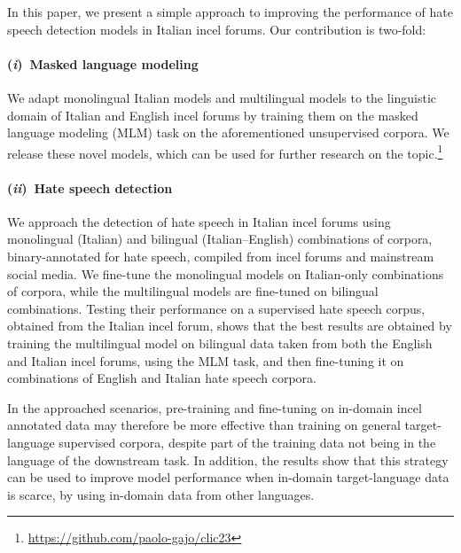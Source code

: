 \documentclass[11pt]{article}
\newcommand{\Ni}{({\em i})~}
\newcommand{\Nii}{({\em ii})~}
\newcommand{\todoA}[1]{\todo[color=blue!40]{A: #1}}
\begin{document}
In this paper, we present a simple approach to improving the performance of hate speech detection models in Italian incel forums. Our contribution is two-fold:


\paragraph{\Ni Masked language modeling} We adapt monolingual Italian models and multilingual models to the linguistic domain of Italian and English incel forums by training them on the masked language modeling (MLM) task on the aforementioned unsupervised corpora. We release these novel models, which can be used for further research on the topic.\footnote{\url{https://github.com/paolo-gajo/clic23}}

\paragraph{\Nii Hate speech detection}
We approach the detection of hate speech in Italian incel forums using monolingual (Italian) and bilingual (Italian--English) combinations of corpora, binary-annotated for hate speech, compiled from incel forums and mainstream social media. We fine-tune the monolingual models on Italian-only combinations of corpora, while the multilingual models are fine-tuned on bilingual combinations. Testing their performance on a supervised hate speech corpus, obtained from the Italian incel forum, shows that the best results are obtained by training the multilingual model on bilingual data taken from both the English and Italian incel forums, using the MLM task, and then fine-tuning it on combinations of English and Italian hate speech corpora.

In the approached scenarios, pre-training and fine-tuning on in-domain incel annotated data may therefore be more effective than training on general target-language supervised corpora, despite part of the training data not being in the language of the downstream task. In addition, the results show that this strategy can be used to improve model performance when in-domain target-language data is scarce, by using in-domain data from other languages.
\end{document}
